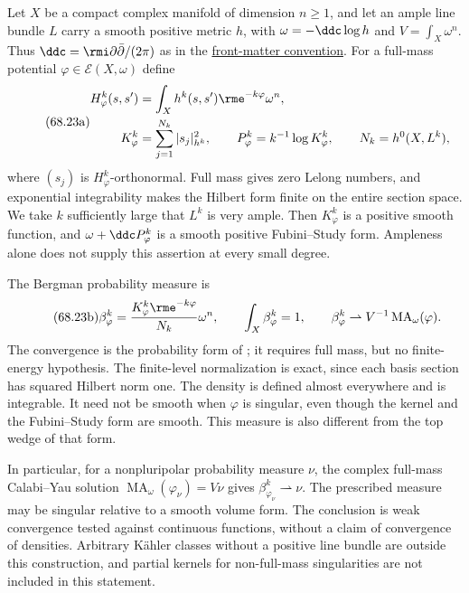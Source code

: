 Let $X$ be a compact complex manifold of dimension $n\geq1$, and let
an ample line bundle $L$ carry a smooth positive metric $h$, with
$\omega=-\ddc\log h$ and $V=\int_X\omega^n$. Thus
$\ddc=\rmi\partial\bar\partial/(2\pi)$ as in the
\hyperref[front:conventions-curvature]{front-matter convention}.
For a full-mass potential
$\varphi\in\mathcal E(X,\omega)$ define
\[
\tag{68.23a}\label{eq:ytd-full-mass-bergman-data}
\begin{split}
 H^k_\varphi(s,s')&=\int_Xh^k(s,s')\rme^{-k\varphi}\omega^n,\\
 K^k_\varphi&=\sum_{j=1}^{N_k}|s_j|_{h^k}^2,
 \qquad P^k_\varphi=k^{-1}\log K^k_\varphi,
 \qquad N_k=h^0(X,L^k),
\end{split}
\]
where $(s_j)$ is $H^k_\varphi$-orthonormal. Full mass gives zero
Lelong numbers, and exponential integrability makes the Hilbert form
finite on the entire section space. We take $k$ sufficiently large
that $L^k$ is very ample. Then $K^k_\varphi$ is a positive smooth
function, and $\omega+\ddc P^k_\varphi$ is a smooth positive
Fubini--Study form. Ampleness alone does not supply this assertion
at every small degree.

The Bergman probability measure is
\[
\tag{68.23b}\label{eq:ytd-bergman-probability-limit}
 \beta^k_\varphi
   =\frac{K^k_\varphi\rme^{-k\varphi}}{N_k}\omega^n,
 \qquad \int_X\beta^k_\varphi=1,
 \qquad
 \beta^k_\varphi\rightharpoonup V^{-1}\operatorname{MA}_\omega(\varphi).
\]
The convergence is the probability form of
\cite[Theorems~1.4 and~5.4]{BlockiDarvas26Radon}; it requires full
mass, but no finite-energy hypothesis. The finite-level normalization
is exact, since each basis section has squared Hilbert norm one.
The density is defined almost everywhere and is integrable. It need
not be smooth when $\varphi$ is singular, even though the kernel and
the Fubini--Study form are smooth. This measure is also different
from the top wedge of that form.

In particular, for a nonpluripolar probability measure $\nu$, the
complex full-mass Calabi--Yau solution
$\operatorname{MA}_\omega(\varphi_\nu)=V\nu$ gives
$\beta^k_{\varphi_\nu}\rightharpoonup\nu$.
The prescribed measure may be singular relative to a smooth volume
form. The conclusion is weak convergence tested against continuous
functions, without a claim of convergence of densities. Arbitrary
K\"ahler classes without a positive line bundle are outside this
construction, and partial kernels for non-full-mass singularities
are not included in this statement.

